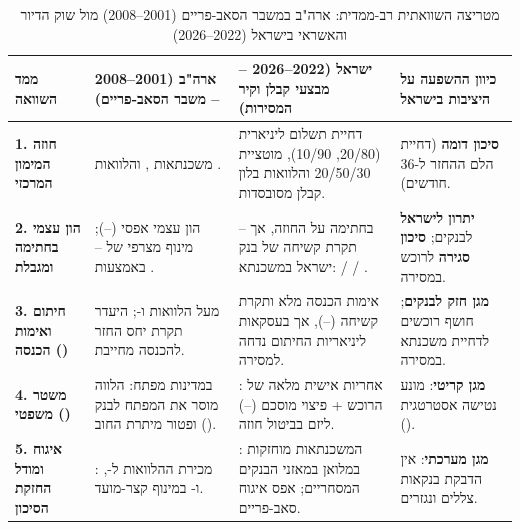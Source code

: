 \begin{table}[htbp]
\caption{מטריצה השוואתית רב-ממדית: ארה"ב במשבר הסאב-פריים (\num{2001}--\num{2008}) מול שוק הדיור והאשראי בישראל (\num{2022}--\num{2026}) \cite{mian2009consequences,keys2010did,ghent2011recourse,boi2025stability,boi2025directive,salelaw1974}}
\label{tab:us_vs_israel_comparison}
\centering
\footnotesize
\renewcommand{\arraystretch}{1.26}
\begin{tabularx}{\textwidth}{R{2.3cm} Y Y R{2.1cm}}
\toprule
{}
\textbf{ממד השוואה} & \textbf{ארה"ב (\num{2001}--\num{2008} – משבר הסאב-פריים)} & \textbf{ישראל (\num{2022}--\num{2026} – מבצעי קבלן וקיר המסירות)} & \textbf{כיוון ההשפעה על היציבות בישראל} \\
\midrule
\textbf{1. חוזה המימון המרכזי} & משכנתאות ,  והלוואות . & דחיית תשלום ליניארית (\num{20/80}, \num{10/90}), מוטציית \num{20/50/30} והלוואות בלון קבלן מסובסדות. & \textbf{\color{BrandGold}סיכון דומה} (דחיית הלם ההחזר ל-\num{36} חודשים). \\
\textbf{2. הון עצמי בחתימה ומגבלת } & הון עצמי אפסי (--); מינוף מצרפי  של -- באמצעות . & -- בחתימה על החוזה, אך תקרת  קשיחה של בנק ישראל במשכנתא:  /  / . & \textbf{\color{BrandTeal}יתרון לישראל} לבנקים; \textbf{\color{BrandRed}סיכון סגירה} לרוכש במסירה. \\
\textbf{3. חיתום ואימות הכנסה ()} & מעל  הלוואות  ו-; היעדר תקרת יחס החזר להכנסה מחייבת. & אימות הכנסה מלא ותקרת  קשיחה (--), אך בעסקאות ליניאריות החיתום נדחה למסירה. & \textbf{\color{BrandTeal}מגן חזק לבנקים}; חושף רוכשים לדחיית משכנתא במסירה. \\
\textbf{4. משטר משפטי ()} & \textbf{} במדינות מפתח: הלווה מוסר את המפתח לבנק () ופטור מיתרת החוב. & \textbf{}: אחריות אישית מלאה של הרוכש + פיצוי מוסכם (--) ליזם בביטול חוזה. & \textbf{\color{BrandTeal}מגן קריטי}: מונע נטישה אסטרטגית (). \\
\textbf{5. איגוח ומודל החזקת הסיכון} & \textbf{}: מכירת ההלוואות ל-,  ו- במינוף  קצר-מועד. & \textbf{}: המשכנתאות מוחזקות במלואן במאזני הבנקים המסחריים; אפס איגוח סאב-פריים. & \textbf{\color{BrandTeal}מגן מערכתי}: אין הדבקת בנקאות צללים ונגזרים. \\

\end{tabularx}
\end{table}
